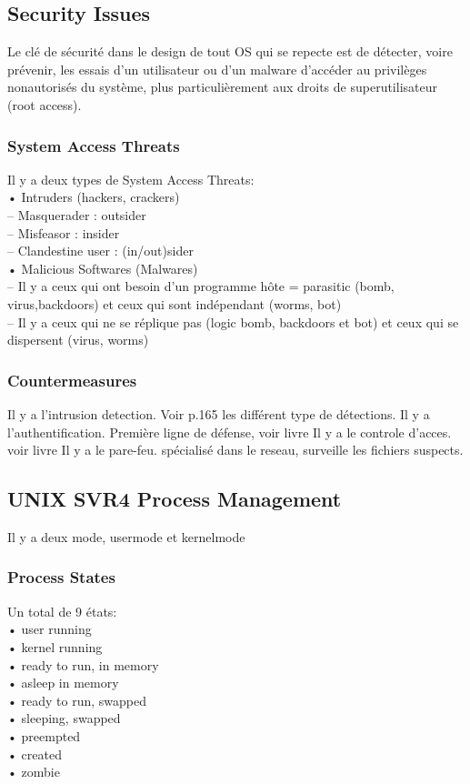 \subsection{Security Issues}
Le clé de sécurité dans le design de tout OS qui se repecte est de détecter, voire prévenir, les essais d’un utilisateur ou d’un malware d’accéder au privilèges nonautorisés du système, plus particulièrement aux droits de superutilisateur (root access).
\subsubsection{System Access Threats}
Il y a deux types de System Access Threats:  \\
• Intruders (hackers, crackers) \\
– Masquerader : outsider \\
– Misfeasor : insider \\
– Clandestine user : (in/out)sider \\
• Malicious Softwares (Malwares) \\
– Il y a ceux qui ont besoin d’un programme hôte = parasitic (bomb, virus,backdoors) et ceux qui sont indépendant (worms, bot) \\
– Il y a ceux qui ne se réplique pas (logic bomb, backdoors et bot) et ceux qui se dispersent (virus, worms) \\
\subsubsection{Countermeasures}
Il y a l’intrusion detection. Voir p.165 les différent type de détections.
Il y a l’authentification. Première ligne de défense, voir livre Il y a le controle d’acces. voir livre Il y a le pare-feu. spécialisé dans le reseau, surveille les fichiers suspects.
\subsection{UNIX SVR4 Process Management}
Il y a deux mode, usermode et kernelmode
\subsubsection{Process States}
Un total de 9 états: \\
• user running \\
• kernel running \\
• ready to run, in memory \\
• asleep in memory \\
• ready to run, swapped \\
• sleeping, swapped \\
• preempted \\
• created \\
• zombie \\
